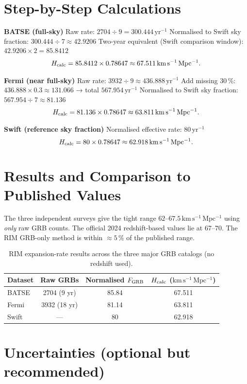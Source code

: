 \documentclass[12pt]{article}
\begin{document}
\section{Step-by-Step Calculations}

\textbf{BATSE (full-sky)}  
Raw rate: \(2704 \div 9 = 300.444\,\mathrm{yr^{-1}}\)  
Normalised to Swift sky fraction: \(300.444 \div 7 \approx 42.9206\)  
Two-year equivalent (Swift comparison window): \(42.9206 \times 2 = 85.8412\)  
\[
H_{\rm calc} = 85.8412 \times 0.78647 \approx 67.511\,\mathrm{km\,s^{-1}\,Mpc^{-1}}.
\]

\textbf{Fermi (near full-sky)}  
Raw rate: \(3932 \div 9 \approx 436.888\,\mathrm{yr^{-1}}\)  
Add missing 30\,\%: \(436.888 \times 0.3 \approx 131.066\) → total \(567.954\,\mathrm{yr^{-1}}\)  
Normalised to Swift sky fraction: \(567.954 \div 7 \approx 81.136\)  
\[
H_{\rm calc} = 81.136 \times 0.78647 \approx 63.811\,\mathrm{km\,s^{-1}\,Mpc^{-1}}.
\]

\textbf{Swift (reference sky fraction)}  
Normalised effective rate: \(80\,\mathrm{yr^{-1}}\)  
\[
H_{\rm calc} = 80 \times 0.78647 \approx 62.918\,\mathrm{km\,s^{-1}\,Mpc^{-1}}.
\]

\section{Results and Comparison to Published Values}

The three independent surveys give the tight range \(62\)--\(67.5\,\mathrm{km\,s^{-1}\,Mpc^{-1}}\) using \emph{only} raw GRB counts. The official 2024 redshift-based values lie at \(67\)--\(70\). The RIM GRB-only method is within \(\approx 5\,\%\) of the published range.

\begin{table}[htbp]
\centering
\begin{tabular}{lccc}
\toprule
Dataset & Raw GRBs & Normalised \(F_{\rm GRB}\) & \(H_{\rm calc}\) (\(\mathrm{km\,s^{-1}\,Mpc^{-1}}\)) \\
\midrule
BATSE   & 2704 (9 yr) & 85.84 & 67.511 \\
Fermi   & 3932 (18 yr) & 81.14 & 63.811 \\
Swift   & --- & 80 & 62.918 \\
\bottomrule
\end{tabular}
\caption{RIM expansion-rate results across the three major GRB catalogs (no redshift used).}
\label{tab:results}
\end{table}

\section{Uncertainties (optional but recommended)}
\end{document}
